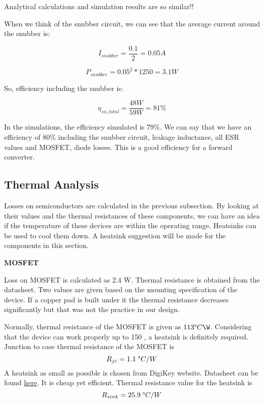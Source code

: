 Analytical calculations and simulation results are so similar!!

When we think of the snubber circuit, we can see that the average current around the snubber is:

\begin{equation}
    I_{snubber} = \dfrac{0.1}{2} = 0.05A
\end{equation}

\begin{equation}
    P_{snubber} = 0.05^2 * 1250 = 3.1W
\end{equation}

So, efficiency including the snubber is:

\begin{equation}
    \eta_{sn,total} = \dfrac{48W}{59W} = 81\%
\end{equation}

In the simulations, the efficiency simulated is 79\%. We can say that we have an efficiency of 80\% including the snubber circuit, leakage inductance, all ESR values and MOSFET, diode losses. This is a good efficiency for a forward converter.

\subsection{Thermal Analysis}

Losses on semiconductors are calculated in the previous subsection. By looking at their values and the thermal resistances of these components, we can have an idea if the temperature of these devices are within the operating range. Heatsinks can be used to cool them down. A heatsink suggestion will be made for the components in this section. 

\textbf{MOSFET}

Loss on MOSFET is calculated as 2.4 W. Thermal resistance is obtained from the datasheet. Two values are given based on the mounting specification of the device. If a copper pad is built under it the thermal resistance decreases significantly but that was not the practice in our design.

Normally, thermal resistance of the MOSFET is given as $113 \degree C \W$. Considering that the device can work properly up to 150 \degreeC, a heatsink is definitely required. Junction to case thermal resistance of the MOSFET is
$$R_{jc} = 1.1 \; \degree C /W$$
A heatsink as small as possible is chosen from DigiKey website. Datasheet can be found \href{https://www.digikey.com/product-detail/en/aavid-thermal-division-of-boyd-corporation/577102B00000G/HS106-ND/108319}{here}. It is cheap yet efficient. Thermal resistance value for the heatsink is 
$$R_{sink} = 25.9\; \degree C /W$$


